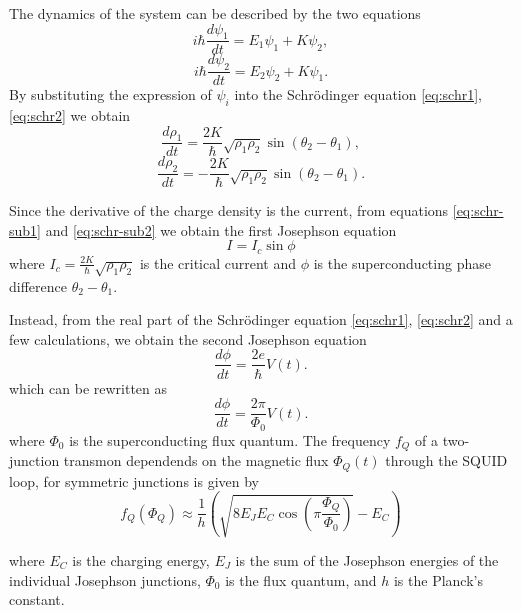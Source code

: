 The dynamics of the system can be described by the two equations\begin{equation}\label{eq:schr1}
    i\hbar \frac{d\psi_1}{dt} = E_1 \psi_1 + K \psi_2,
\end{equation}
\begin{equation}\label{eq:schr2}
    i\hbar \frac{d\psi_2}{dt} = E_2 \psi_2 + K \psi_1.
\end{equation}
By substituting the expression of $\psi_i$ into the Schr\"odinger equation \ref{eq:schr1}, \ref{eq:schr2} we obtain
\begin{equation}\label{eq:schr-sub1}
    \frac{d\rho_1}{dt} = \frac{2K}{\hbar} \sqrt{\rho_1 \rho_2} \sin(\theta_2 - \theta_1),
\end{equation}
\begin{equation}\label{eq:schr-sub2}
    \frac{d\rho_2}{dt} = -\frac{2K}{\hbar} \sqrt{\rho_1 \rho_2} \sin(\theta_2 - \theta_1).
\end{equation}

Since the derivative of the charge density is the current, from equations \ref{eq:schr-sub1} and \ref{eq:schr-sub2} we obtain the first Josephson equation
\begin{equation}\label{eq:Josephson1}
    I=I_c\sin{\phi}
\end{equation} 
where $I_c = \frac{2K}{\hbar}\sqrt{\rho_1\rho_2}$ is the critical current and $\phi$ is the superconducting phase difference $\theta_2 - \theta_1$.

Instead, from the real part of the Schr\"odinger equation \ref{eq:schr1}, \ref{eq:schr2} and a few calculations, we obtain the second Josephson equation
\begin{equation}\label{eq:Josephson2}
    \frac{d\phi}{dt} = \frac{2e}{\hbar} V(t).
\end{equation}
which can be rewritten as \begin{equation}
    \frac{d\phi}{dt} = \frac{2\pi}{\Phi_0} V(t).
\end{equation}
where $\Phi_0$ is the superconducting flux quantum.
The frequency $f_Q$ of a two-junction transmon dependends on the magnetic flux $\Phi_Q(t)$ through the SQUID loop, for symmetric junctions is given by\cite{TransmonPaper}
\begin{equation}\label{eq:freqdepndenceonflux}
    f_Q(\Phi_Q) \approx \frac{1}{h} \left( \sqrt{8E_J E_C \cos\left(\pi \frac{\Phi_Q}{\Phi_0} \right)} - E_C \right)    
\end{equation}

where $E_C$ is the charging energy, $E_J$ is the sum of the Josephson energies of the individual Josephson junctions, $\Phi_0$ is the flux quantum, and $h$ is the Planck's constant.

